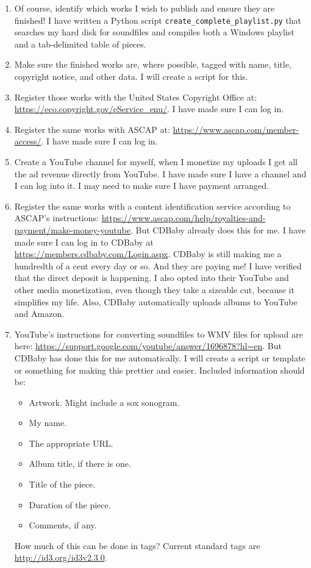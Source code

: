 \documentclass[english,11pt,letterpaper,onecolumn]{scrartcl}
\begin{document}
\begin{enumerate}
\item Of course, identify which works I wish to publish and ensure they are finished! I have written a Python script \texttt{create\_complete\_playlist.py} that searches my hard disk for soundfiles and compiles both a Windows playlist and a tab-delimited table of pieces.
\item Make sure the finished works are, where possible, tagged with name, title, copyright notice, and other data. I will create a script for this.
\item Register those works with the United States Copyright Office at: \url{https://eco.copyright.gov/eService_enu/}. I have made sure I can log in.
\item Register the same works with ASCAP at: \url{https://www.ascap.com/member-access/}. I have made sure I can log in.
\item Create a YouTube channel for myself, when I monetize my uploads I get all the ad revenue directly from YouTube. I have made sure I have a channel and I can log into it. I may need to make sure I have payment arranged.
\item Register the same works with a content identification service according to ASCAP's instructions: \url{https://www.ascap.com/help/royalties-and-payment/make-money-youtube}. But CDBaby already does this for me. I have made sure I can log in to CDBaby at \url{https://members.cdbaby.com/Login.aspx}. CDBaby is still making me a hundredth of a cent every day or so. And they are paying me! I have verified that the direct deposit is happening. I also opted into their YouTube and other media monetization, even though they take a sizeable cut, because it simplifies my life. Also, CDBaby automatically uploads albums to YouTube and Amazon.
\item YouTube's instructions for converting soundfiles to WMV files for upload are here: \url{https://support.google.com/youtube/answer/1696878?hl=en}. But CDBaby has done this for me automatically. I will create a script or template or something for making this prettier and easier. Included information should be:
\begin{itemize}
\item Artwork. Might include a sox sonogram.
\item My name.
\item The appropriate URL.
\item Album title, if there is one.
\item Title of the piece.
\item Duration of the piece.
\item Comments, if any.
\end{itemize}
\noindent How much of this can be done in tags? Current standard tags are \url{http://id3.org/id3v2.3.0}.
\end{enumerate}
\end{document}
